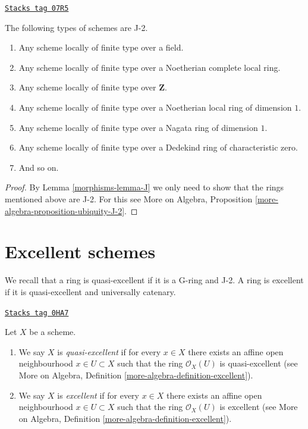 \begin{lemma}[Ubiquity J 2]
\label{morphisms-lemma-ubiquity-J-2}
\href{https://stacks.math.columbia.edu/tag/07R5}{\texttt{Stacks tag 07R5}}

The following types of schemes are J-2.
\begin{enumerate}
\item Any scheme locally of finite type over a field.
\item Any scheme locally of finite type over a Noetherian complete local ring.
\item Any scheme locally of finite type over $\mathbf{Z}$.
\item Any scheme locally of finite type over a Noetherian local ring
of dimension $1$.
\item Any scheme locally of finite type over a Nagata ring of dimension $1$.
\item Any scheme locally of finite type over a Dedekind ring of
characteristic zero.
\item And so on.
\end{enumerate}
\end{lemma}

\begin{proof}

By Lemma \ref{morphisms-lemma-J} we only need to show that
the rings mentioned above are J-2. For this see
More on Algebra, Proposition \ref{more-algebra-proposition-ubiquity-J-2}.
\end{proof}

\section{Excellent schemes}
\label{morphisms-section-excellent}
We recall that a ring is quasi-excellent if it is a G-ring and J-2.
A ring is excellent if it is quasi-excellent and universally catenary.

\begin{definition}[Excellent]
\label{morphisms-definition-excellent}
\href{https://stacks.math.columbia.edu/tag/0HA7}{\texttt{Stacks tag 0HA7}}

Let $X$ be a scheme.
\begin{enumerate}
\item We say $X$ is {\it quasi-excellent} if for every $x \in X$ there exists
an affine open neighbourhood $x \in U \subset X$ such that the ring
$\mathcal{O}_X(U)$ is quasi-excellent (see
More on Algebra, Definition \ref{more-algebra-definition-excellent}).
\item We say $X$ is {\it excellent} if for every $x \in X$ there exists an
affine open neighbourhood $x \in U \subset X$ such that the ring
$\mathcal{O}_X(U)$ is excellent (see
More on Algebra, Definition \ref{more-algebra-definition-excellent}).
\end{enumerate}
\end{definition}

